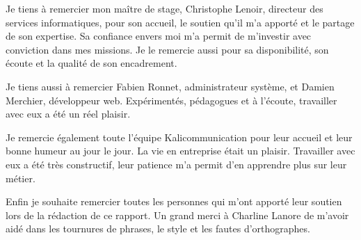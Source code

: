Je tiens à remercier mon maître de stage, Christophe Lenoir, directeur des services informatiques, pour son accueil, le soutien qu'il m'a apporté et le partage de son expertise. Sa confiance envers moi m'a permit de m'investir avec conviction dans mes missions. Je le remercie aussi pour sa disponibilité, son écoute et la qualité de son encadrement.\newline

Je tiens aussi à remercier Fabien Ronnet, administrateur système, et Damien Merchier, développeur web. Expérimentés, pédagogues et à l'écoute, travailler avec eux a été un réel plaisir.\newline

Je remercie également toute l'équipe Kalicommunication pour leur accueil et leur bonne humeur au jour le jour. La vie en entreprise était un plaisir. Travailler avec eux a été très constructif, leur patience m'a permit d'en apprendre plus sur leur métier.\newline

Enfin je souhaite remercier toutes les personnes qui m'ont apporté leur soutien lors de la rédaction de ce rapport. Un grand merci à Charline Lanore de m'avoir aidé dans les tournures de phrases, le style et les fautes d'orthographes.